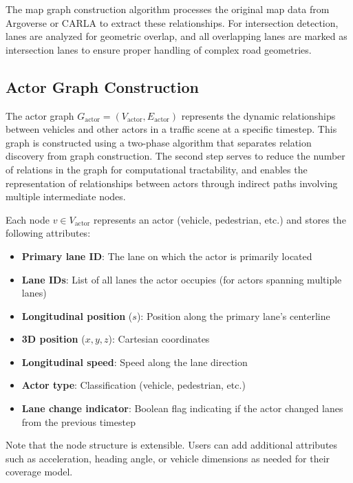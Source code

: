 The map graph construction algorithm processes the original map data from Argoverse or CARLA  
to extract these relationships. For intersection detection, lanes are analyzed for geometric 
overlap, and all overlapping lanes are marked as intersection lanes to ensure proper handling of 
complex road geometries.

\subsection{Actor Graph Construction}
\label{subsec:actor_graph}

The actor graph $G_{\text{actor}} = (V_{\text{actor}}, E_{\text{actor}})$ represents the dynamic 
relationships between vehicles and other actors in a traffic scene at a specific timestep. This 
graph is constructed using a two-phase algorithm that separates relation discovery from graph 
construction. The second step serves to reduce the number of relations in the graph for computational tractability, 
and enables the representation of relationships between actors through indirect paths involving multiple intermediate nodes.


Each node $v \in V_{\text{actor}}$ represents an actor (vehicle, pedestrian, etc.) and stores the 
following attributes:

\begin{itemize}
    \item \textbf{Primary lane ID}: The lane on which the actor is primarily located
    \item \textbf{Lane IDs}: List of all lanes the actor occupies (for actors spanning multiple 
          lanes)
    \item \textbf{Longitudinal position} ($s$): Position along the primary lane's centerline
    \item \textbf{3D position} ($x, y, z$): Cartesian coordinates
    \item \textbf{Longitudinal speed}: Speed along the lane direction
    \item \textbf{Actor type}: Classification (vehicle, pedestrian, etc.)
    \item \textbf{Lane change indicator}: Boolean flag indicating if the actor changed lanes from 
          the previous timestep
\end{itemize}

Note that the node structure is extensible. Users can add additional attributes such as 
acceleration, heading angle, or vehicle dimensions as needed for their coverage model.


